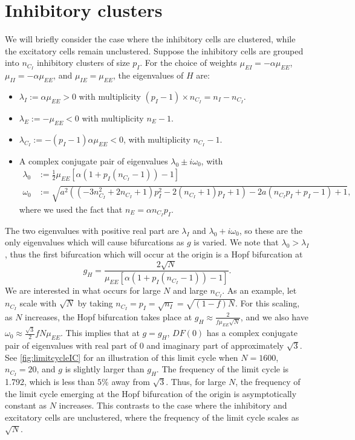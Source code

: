 \documentclass[reqno]{siamonline190516}
\begin{document}
\section{Inhibitory clusters}\label{sec:inhibitoryclusters}

We will briefly consider the case where the inhibitory cells are clustered, while the excitatory cells remain unclustered. Suppose the inhibitory cells are grouped into $n_{C_I}$ inhibitory clusters of size $p_I$. For the choice of weights $\mu_{EI} = -\alpha \mu_{EE}$, $\mu_{II} = -\alpha \mu_{EE}$, and $\mu_{IE} = \mu_{EE}$, the eigenvalues of $H$ are:
\begin{itemize}
\item $\lambda_I := \alpha \mu_{EE} > 0$ with multiplicity $(p_I-1) \times n_{C_I} = n_I - n_{C_I}$.
\item $\lambda_E := -\mu_{EE} < 0$ with multiplicity $n_E - 1$.
\item $\lambda_{C_I} := -(p_I-1)\alpha \mu_{EE} < 0$, with multiplicity $n_{C_I}-1$.
\item A complex conjugate pair of eigenvalues $\lambda_0 \pm i \omega_0$, with 
\begin{align*}
    \lambda_0 &:= \frac{1}{2}\mu_{EE} \left[ \alpha( 1 + p_I(n_{C_I}-1)) -1 \right]
      \\
    \omega_0 &:= \sqrt{a^2 \left(\left(-3 n_{C_I}^2+2 n_{C_I}+1\right) p_I^2-2 (n_{C_I}+1) p_I+1\right)-2 a
    (n_{C_I}p_I +p_I -1)+1},
\end{align*}
where we used the fact that $n_E = \alpha n_{C_I} p_I$.
\end{itemize}
The two eigenvalues with positive real part are $\lambda_I$ and $\lambda_0 + i \omega_0$, so these are the only eigenvalues which will cause bifurcations as $g$ is varied. We note that $\lambda_0 > \lambda_I$, thus the first bifurcation which will occur at the origin is a Hopf bifurcation at 
\[
g_H = \frac{2 \sqrt{N}}{\mu_{EE} \left[ \alpha( 1 + p_I(n_{C_I}-1)) -1 \right] }.
\]
We are interested in what occurs for large $N$ and large $n_{C_I}$. As an example, let $n_{C_I}$ scale with $\sqrt{N}$ by taking $n_{C_I} = p_I = \sqrt{n_I} = \sqrt{(1-f)N}$. For this scaling, as $N$ increases, the Hopf bifurcation takes place at $g_H \approx \frac{2}{f \mu_{EE} \sqrt{N}}$, and we also have $\omega_0 \approx \frac{\sqrt{3}}{2}f N \mu_{EE}$. This implies that at $g = g_H$, $DF(0)$ has a complex conjugate pair of eigenvalues with real part of 0 and imaginary part of approximately $\sqrt{3}$. See \cref{fig:limitcycleIC} for an illustration of this limit cycle when $N=1600$, $n_{C_I}=20$, and $g$ is slightly larger than $g_H$. The frequency of the limit cycle is 1.792, which is less than $5\%$ away from $\sqrt{3}$. Thus, for large $N$, the frequency of the limit cycle emerging at the Hopf bifurcation of the origin is asymptotically constant as $N$ increases. This contrasts to the case where the inhibitory and excitatory cells are unclustered, where the frequency of the limit cycle scales as $\sqrt{N}$.
\end{document}

